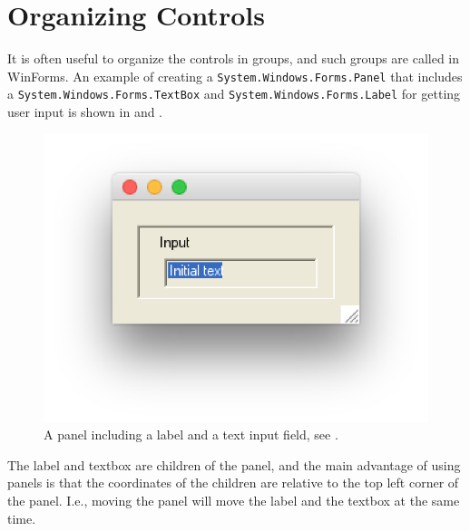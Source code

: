 \documentclass[fsharpnotes.tex]{subfiles}
\begin{document}
\section{Organizing Controls}
It is often useful to organize the controls in groups, and such groups are called  in WinForms. An example of creating a \lstinline{System.Windows.Forms.Panel} that includes a \lstinline{System.Windows.Forms.TextBox} and \lstinline{System.Windows.Forms.Label} for getting user input is shown in  and . 
%
%
\begin{figure}
  \centering
  \includegraphics[scale=0.3]{panel}
  \caption{A panel including a label and a text input field, see .}
  \label{fig:panel}
\end{figure}
The label and textbox are children of the panel, and the main advantage of using panels is that the coordinates of the children are relative to the top left corner of the panel. I.e., moving the panel will move the label and the textbox at the same time.
\end{document}
